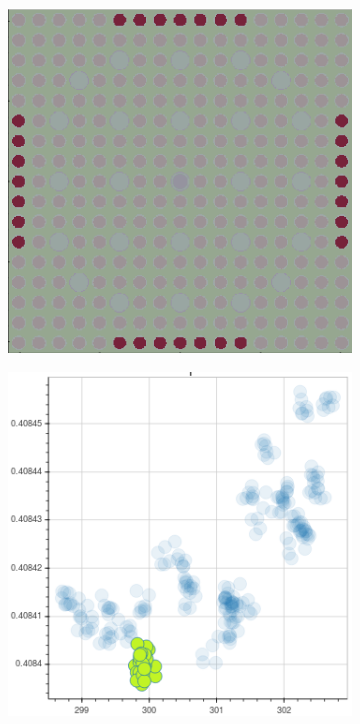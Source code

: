 \begin{figure}[h!]
\begin{subfigure}{0.42\textwidth}
  \caption{}
  \label{fig:chap10-fiss-mean-spect-ind-mgxs}
\end{subfigure}
\begin{subfigure}{0.42\textwidth}
  \centering
  \includegraphics[width=0.9\linewidth]{figures/unsupervised/features/assm-16/u235-fiss/mean-spect-ind/geometry-2}
  \caption{}
  \label{fig:chap10-fiss-mean-spect-ind-geom-2}
\end{subfigure}%
\begin{subfigure}{0.42\textwidth}
  \centering
  \includegraphics[width=0.9\linewidth]{figures/unsupervised/features/assm-16/u235-fiss/mean-spect-ind/mgxs-2}

\end{subfigure}
\end{figure}
